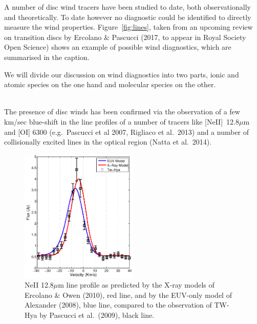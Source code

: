\documentclass[10pt,fleqn,twoside]{article}
\begin{document}
A number of disc wind tracers have been studied to date, both
observationally and theoretically. To date however no diagnostic could
be identified to directly measure the wind properties. 
Figure~\ref{fig:lines}, taken from an upcoming review on transition discs by
Ercolano \& Pascucci (2017, to appear in Royal Society Open Science)
shows an example of possible wind diagnostics, which are summarised in
the caption.  


We will divide our discussion on wind diagnostics into two parts,
ionic and atomic species on the one hand and molecular species on the
other. 

\vspace{0.5em}{\Tcol\bf Ionic and atomic species}\\
The presence of disc winds has been confirmed via the
observation of a few km/sec blue-shift in the line profiles of a
number of tracers like [NeII]~12.8$\mu$m and [OI] 6300 (e.g.\ Pascucci
et al 2007, Rigliaco et al.\ 2013) and a number of collisionally excited lines in the optical
region (Natta et al.\ 2014). 

 \begin{figure}
   \centering
   \includegraphics[width=0.5\textwidth]{neii.jpg}
   \caption{NeII 12.8$\mu$m line profile as predicted by the X-ray
     models of Ercolano \& Owen (2010), red line, and  by the EUV-only
     model of Alexander (2008), blue line, compared to the observation
     of TW-Hya by Pascucci et al.\ (2009), black line.
}
              \label{fig:neii}%
    \end{figure}
\end{document}
